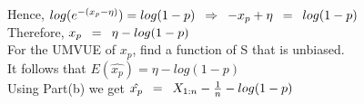Hence, $log(e^{-(x_p - \eta)}) = log(1-p) \enskip \Rightarrow \enskip -x_p + \eta \enskip = \enskip log(1-p)$\\

Therefore, $x_p \enskip = \enskip \eta - log(1-p)$\\

For the UMVUE of $x_p$, find a function of S that is unbiased.\\

It follows that $E(\hat{x_p}) = \eta - log(1-p)$\\

Using Part(b) we get $\hat{x_p} \enskip = \enskip X_{1:n} - \frac{1}{n} - log(1-p)$\\
